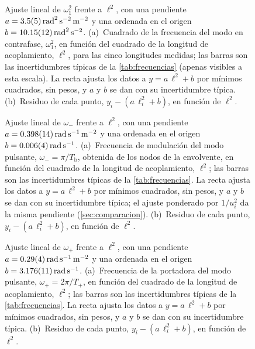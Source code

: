 \documentclass[a4paper,11pt]{amsart}
\numberwithin{equation}{section}
\newcommand{\Tb}{T_{\mathrm{b}}}              %
\newcommand{\Tp}{T_{+}}                       %
\newcommand{\wu}{\omega_1}                    %
\newcommand{\wm}{\omega_{-}}                  %
\newcommand{\wpl}{\omega_{+}}                 %
\theoremstyle{cienplano}
\theoremstyle{ciendef}
\theoremstyle{cienobs}
\begin{document}
\begin{figure}[ht]
\centering

\caption{Ajuste lineal de $\wu^{2}$ frente a $\ell^{2}$, con una pendiente
$a=\SI{3,5 \pm 0,5}{\radian\squared\per\second\squared\per\meter\squared}$ y
una ordenada en el origen $b=\SI{10,15 \pm 0,12}{\radian\squared\per\second\squared}$.
(a)~Cuadrado de la frecuencia del modo en contrafase, $\wu^{2}$, en función del
cuadrado de la longitud de acoplamiento, $\ell^{2}$, para las cinco longitudes
medidas; las barras son las incertidumbres típicas de la \cref{tab:frecuencias}
(apenas visibles a esta escala). La recta ajusta los datos a $y=a\,\ell^{2}+b$
por mínimos cuadrados, sin pesos, y $a$ y $b$ se dan con su incertidumbre
típica. (b)~Residuo de cada punto, $y_i-(a\,\ell_i^{2}+b)$, en función de
$\ell^{2}$.}
\label{fig:ajuste-w1}
\end{figure}

\begin{figure}[ht]
\centering

\caption{Ajuste lineal de $\wm$ frente a $\ell^{2}$, con una pendiente
$a=\SI{0,398 \pm 0,014}{\radian\per\second\per\meter\squared}$ y una ordenada
en el origen $b=\SI{0,006 \pm 0,004}{\radian\per\second}$. (a)~Frecuencia de
modulación del modo pulsante, $\wm=\pi/\Tb$, obtenida de los nodos de la
envolvente, en función del cuadrado de la longitud de acoplamiento,
$\ell^{2}$; las barras son las incertidumbres típicas de la
\cref{tab:frecuencias}. La recta ajusta los datos a $y=a\,\ell^{2}+b$ por
mínimos cuadrados, sin pesos, y $a$ y $b$ se dan con su incertidumbre típica;
el ajuste ponderado por $1/u_i^{2}$ da la misma pendiente
(\cref{sec:comparacion}). (b)~Residuo de cada punto, $y_i-(a\,\ell_i^{2}+b)$,
en función de $\ell^{2}$.}
\label{fig:ajuste-wm}
\end{figure}

\begin{figure}[ht]
\centering

\caption{Ajuste lineal de $\wpl$ frente a $\ell^{2}$, con una pendiente
$a=\SI{0,29 \pm 0,04}{\radian\per\second\per\meter\squared}$ y una ordenada en
el origen $b=\SI{3,176 \pm 0,011}{\radian\per\second}$. (a)~Frecuencia de la
portadora del modo pulsante, $\wpl=2\pi/\Tp$, en función del cuadrado de la
longitud de acoplamiento, $\ell^{2}$; las barras son las incertidumbres
típicas de la \cref{tab:frecuencias}. La recta ajusta los datos a
$y=a\,\ell^{2}+b$ por mínimos cuadrados, sin pesos, y $a$ y $b$ se dan con su
incertidumbre típica. (b)~Residuo de cada punto, $y_i-(a\,\ell_i^{2}+b)$, en
función de $\ell^{2}$.}
\label{fig:ajuste-wp}
\end{figure}
\end{document}
